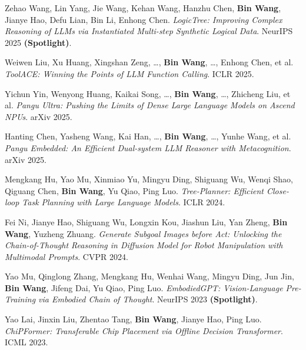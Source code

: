 \documentclass[10pt, a4paper]{article}
\begin{document}
\begin{enumerate}[leftmargin=*, label={[\arabic*]}, itemsep=0.25em,
                  topsep=0.1em, parsep=0pt]

  \item {\small Zehao Wang, Lin Yang, Jie Wang, Kehan Wang, Hanzhu Chen,
    \textbf{Bin Wang}, Jianye Hao, Defu Lian, Bin Li, Enhong Chen.
    \textit{LogicTree: Improving Complex Reasoning of LLMs via Instantiated
    Multi-step Synthetic Logical Data}. NeurIPS 2025 \textbf{(Spotlight)}.}

  \item {\small Weiwen Liu, Xu Huang, Xingshan Zeng, \ldots,
    \textbf{Bin Wang}, \ldots, Enhong Chen, et al.
    \textit{ToolACE: Winning the Points of LLM Function Calling}. ICLR 2025.}

  \item {\small Yichun Yin, Wenyong Huang, Kaikai Song, \ldots,
    \textbf{Bin Wang}, \ldots, Zhicheng Liu, et al.
    \textit{Pangu Ultra: Pushing the Limits of Dense Large Language Models
    on Ascend NPUs}. arXiv 2025.}

  \item {\small Hanting Chen, Yasheng Wang, Kai Han, \ldots,
    \textbf{Bin Wang}, \ldots, Yunhe Wang, et al.
    \textit{Pangu Embedded: An Efficient Dual-system LLM Reasoner
    with Metacognition}. arXiv 2025.}

  \item {\small Mengkang Hu, Yao Mu, Xinmiao Yu, Mingyu Ding, Shiguang Wu,
    Wenqi Shao, Qiguang Chen, \textbf{Bin Wang}, Yu Qiao, Ping Luo.
    \textit{Tree-Planner: Efficient Close-loop Task Planning with Large
    Language Models}. ICLR 2024.}

  \item {\small Fei Ni, Jianye Hao, Shiguang Wu, Longxin Kou, Jiashun Liu,
    Yan Zheng, \textbf{Bin Wang}, Yuzheng Zhuang.
    \textit{Generate Subgoal Images before Act: Unlocking the Chain-of-Thought
    Reasoning in Diffusion Model for Robot Manipulation with Multimodal Prompts}.
    CVPR 2024.}

  \item {\small Yao Mu, Qinglong Zhang, Mengkang Hu, Wenhai Wang, Mingyu Ding,
    Jun Jin, \textbf{Bin Wang}, Jifeng Dai, Yu Qiao, Ping Luo.
    \textit{EmbodiedGPT: Vision-Language Pre-Training via Embodied Chain
    of Thought}. NeurIPS 2023 \textbf{(Spotlight)}.}

  \item {\small Yao Lai, Jinxin Liu, Zhentao Tang, \textbf{Bin Wang},
    Jianye Hao, Ping Luo.
    \textit{ChiPFormer: Transferable Chip Placement via Offline Decision
    Transformer}. ICML 2023.}


\end{enumerate}
\end{document}
